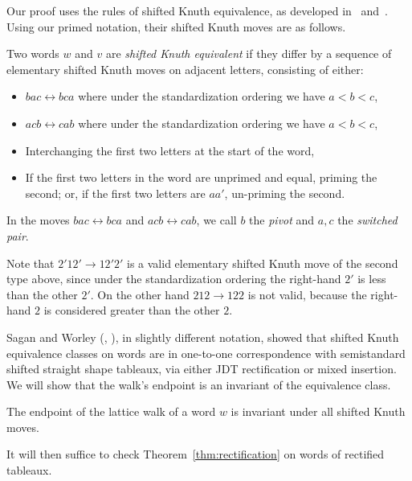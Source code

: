 \documentclass[ALCO,ThmDefs,Unicode,epreuves]{cedram}
\begin{document}
Our proof uses the rules of shifted Knuth equivalence, as developed in~\cite{Sagan} and~\cite{Worley}. Using our primed notation, their shifted Knuth moves are as follows.

\begin{defi}
Two words $w$ and $v$ are \emph{shifted Knuth equivalent} if they differ by a sequence of elementary shifted Knuth moves on adjacent letters, consisting of either:
\begin{itemize}
\item $bac\leftrightarrow bca$ where under the standardization ordering we have $a<b<c$,
\item $acb\leftrightarrow cab$ where under the standardization ordering we have $a<b<c$,
\item Interchanging the first two letters at the start of the word,
\item If the first two letters in the word are unprimed and equal, priming the second; or, if the first two letters are $aa'$, un-priming the second.
\end{itemize}
In the moves $bac \leftrightarrow bca$ and $acb \leftrightarrow cab$, we call $b$ the \emph{pivot} and $a,c$ the \emph{switched pair}.
\end{defi}

\begin{exam}
Note that $2'12'\to 12'2'$ is a valid elementary shifted Knuth move of the second type above, since under the standardization ordering the right-hand $2'$ is less than the other $2'$. On the other hand $212\to 122$ is not valid, because the right-hand $2$ is considered greater than the other $2$.
\end{exam}

Sagan and Worley (\cite{Sagan}, \cite{Worley}), in slightly different notation, showed that shifted Knuth equivalence classes on words are in one-to-one correspondence with semistandard shifted straight shape tableaux, via either JDT rectification or mixed insertion. We will show that the walk's endpoint is an invariant of the equivalence class.

\begin{prop}\label{prop:walks}
The endpoint of the lattice walk of a word $w$ is invariant under all shifted Knuth moves.
\end{prop}
It will then suffice to check Theorem~\ref{thm:rectification} on words of rectified tableaux. 
\end{document}
